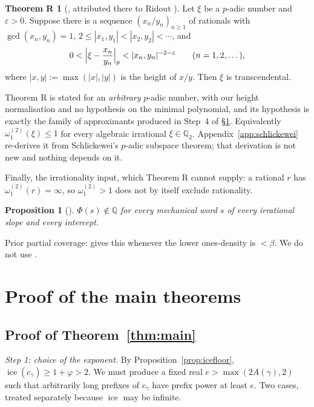 \documentclass[11pt,reqno]{amsart}
\theoremstyle{plain}
\newtheorem{proposition}[theorem]{Proposition}
\theoremstyle{definition}
\newtheorem*{theoremR}{Theorem R}
\DeclareMathOperator{\ice}{ice}
\newcommand{\Q}{\mathbb{Q}}
\newcommand{\Qt}{\Q_2}
\newcommand{\PH}{\Phi}
\newcommand{\Av}{A(\gamma)}
\newcommand{\om}{\omega_1^{(2)}}
\begin{document}
\begin{theoremR}[{\cite[Theorem 1.3]{BK18}, attributed there to Ridout \cite{Ridout58}}]
Let $\xi$ be a $p$-adic number and $\varepsilon>0$. Suppose there is a sequence
$(x_n/y_n)_{n\ge1}$ of rationals with $\gcd(x_n,y_n)=1$,
$2\le|x_1,y_1|<|x_2,y_2|<\cdots$, and
\[
  0<\Bigl|\xi-\frac{x_n}{y_n}\Bigr|_p<|x_n,y_n|^{-2-\varepsilon}\qquad(n=1,2,\dots),
\]
where $|x,y|:=\max(|x|,|y|)$ is the height of $x/y$. Then $\xi$ is transcendental.
\end{theoremR}

Theorem R is stated for an \emph{arbitrary} $p$-adic number, with our height normalisation and no
hypothesis on the minimal polynomial, and its hypothesis is exactly the family of approximants
produced in Step~4 of \S\ref{sec:main}. Equivalently $\om(\xi)\le1$ for every algebraic irrational
$\xi\in\Qt$. Appendix~\ref{app:schlickewei} re-derives it from Schlickewei's $p$-adic subspace
theorem; that derivation is not new and nothing depends on it.

Finally, the irrationality input, which Theorem R cannot supply: a rational $r$ has
$\om(r)=\infty$, so $\om>1$ does not by itself exclude rationality.

\begin{proposition}[{\cite[Theorem 10.1 and Corollary 10.5]{DJirr}}]\label{prop:irr}
$\PH(s)\notin\Q$ for every mechanical word $s$ of every irrational slope and every intercept.
\end{proposition}

Prior partial coverage: \cite[Theorem 2.7(b)]{MY04} gives this whenever the lower ones-density is
$<\beta$. We do not use \cite[Theorem 1]{LS21}.

\section{Proof of the main theorems}\label{sec:main}

\subsection{Proof of Theorem~\ref{thm:main}}

\emph{Step 1: choice of the exponent.} By Proposition~\ref{prop:icefloor},
$\ice(c_\gamma)\ge1+\varphi>2$. We must produce a fixed real $e>\max(2\Av,2)$ such that
arbitrarily long prefixes of $c_\gamma$ have prefix power at least $e$. Two cases, treated
separately because $\ice$ may be infinite.
\end{document}
